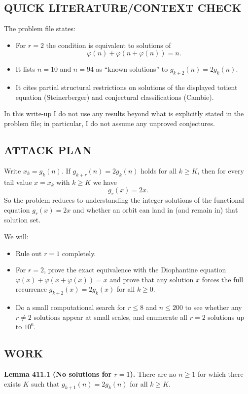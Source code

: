 \subsection*{QUICK LITERATURE/CONTEXT CHECK}
The problem file states:
\begin{itemize}
  \item For $r=2$ the condition is equivalent to solutions of
  \[
    \varphi(n)+\varphi(n+\varphi(n))=n.
  \]
  \item It lists $n=10$ and $n=94$ as ``known solutions'' to $g_{k+2}(n)=2g_k(n)$.
  \item It cites partial structural restrictions on solutions of the displayed totient equation (Steinerberger) and conjectural classifications (Cambie).
\end{itemize}
In this write-up I do not use any results beyond what is explicitly stated in the problem file; in particular, I do not assume any unproved conjectures.

\subsection*{ATTACK PLAN}
Write $x_k=g_k(n)$. If $g_{k+r}(n)=2g_k(n)$ holds for all $k\ge K$, then for every tail value $x=x_k$ with $k\ge K$ we have
$$g_r(x)=2x.$$
So the problem reduces to understanding the integer solutions of the functional equation $g_r(x)=2x$ and whether an orbit can land in (and remain in) that solution set.

We will:
\begin{itemize}
  \item Rule out $r=1$ completely.
  \item For $r=2$, prove the exact equivalence with the Diophantine equation $\varphi(x)+\varphi(x+\varphi(x))=x$ and prove that any solution $x$ forces the full recurrence $g_{k+2}(x)=2g_k(x)$ for all $k\ge0$.
  \item Do a small computational search for $r\le 8$ and $n\le 200$ to see whether any $r\ne 2$ solutions appear at small scales, and enumerate all $r=2$ solutions up to $10^6$.
\end{itemize}

\subsection*{WORK}
\textbf{Lemma 411.1 (No solutions for $r=1$).}
There are no $n\ge 1$ for which there exists $K$ such that $g_{k+1}(n)=2g_k(n)$ for all $k\ge K$.

